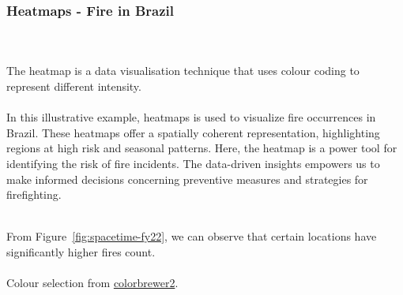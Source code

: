 \documentclass{article}\usepackage[]{graphicx}\usepackage[]{xcolor}
\begin{document}
\subsubsection{Heatmaps - Fire in Brazil}
\\  
\\The heatmap is a data visualisation technique that uses colour coding to represent different intensity.
\\  
\\In this illustrative example, heatmaps is used to visualize fire occurrences in Brazil. These heatmaps offer a spatially coherent representation, highlighting regions at high risk and seasonal patterns. Here, the heatmap is a power tool for identifying the risk of fire incidents. The data-driven insights empowers us to make informed decisions concerning preventive measures and strategies for firefighting.





\\From Figure~\ref{fig:spacetime-fy22}, we can observe that certain locations have significantly higher fires count. 
\\  
\\Colour selection from \href{https://colorbrewer2.org/#type=sequential&scheme=Oranges&n=9}{colorbrewer2}.
\end{document}
